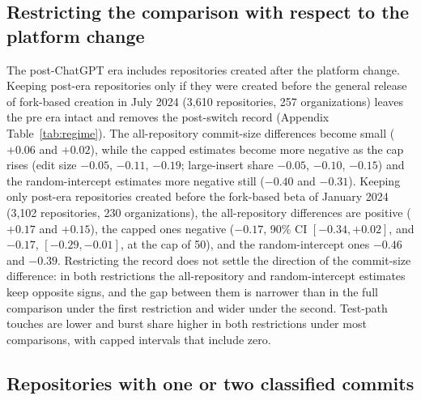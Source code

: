 \documentclass[acmsmall,screen,review,anonymous]{acmart}
\begin{document}
\subsection{Restricting the comparison with respect to the platform change}
\label{sec:restricted}

The post-ChatGPT era includes repositories created after the platform change. Keeping post-era repositories only if they were created before the general release of fork-based creation in July 2024 (3,610 repositories, 257 organizations) leaves the pre era intact and removes the post-switch record (Appendix Table~\ref{tab:regime}). The all-repository commit-size differences become small ($+0.06$ and $+0.02$), while the capped estimates become more negative as the cap rises (edit size $-0.05$, $-0.11$, $-0.19$; large-insert share $-0.05$, $-0.10$, $-0.15$) and the random-intercept estimates more negative still ($-0.40$ and $-0.31$). Keeping only post-era repositories created before the fork-based beta of January 2024 (3,102 repositories, 230 organizations), the all-repository differences are positive ($+0.17$ and $+0.15$), the capped ones negative ($-0.17$, 90\% CI $[-0.34, +0.02]$, and $-0.17$, $[-0.29, -0.01]$, at the cap of 50), and the random-intercept ones $-0.46$ and $-0.39$. Restricting the record does not settle the direction of the commit-size difference: in both restrictions the all-repository and random-intercept estimates keep opposite signs, and the gap between them is narrower than in the full comparison under the first restriction and wider under the second. Test-path touches are lower and burst share higher in both restrictions under most comparisons, with capped intervals that include zero.

\subsection{Repositories with one or two classified commits}
\label{sec:lowcommit}
\end{document}
